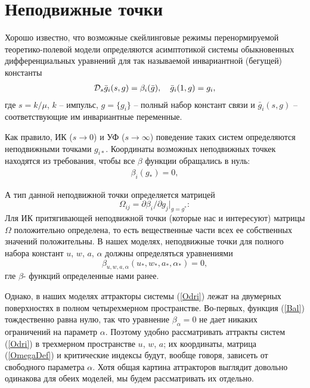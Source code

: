 \documentclass[a4paper,10pt]{article}
\def\D{{\cal D}}
\def\D{{\cal D}}
\begin{document}
\section{Неподвижные точки} \label{sec:FPS}

Хорошо известно, что возможные скейлинговые  режимы перенормируемой теоретико-полевой
модели определяются асимптотикой системы обыкновенных дифференциальных уравнений для так называемой
инвариантной (бегущей) константы
\begin{eqnarray}
\D_s \bar g_{i}(s,g) = \beta_{i} (\bar g), \quad \bar g_{i}(1,g) = g_{i},
\label{Odri}
\end{eqnarray}
где  $s=k/\mu$, $k$ -- импульс, $g= \{g_{i}\}$ -- полный набор констант связи
и  $\bar g_{i}(s,g)$ -- соответствующие им инвариантные переменные.

Как правило, ИК ($s\to0$) и УФ ($s\to\infty$) поведение таких систем определяются неподвижными точками $g_{i*}$.
Координаты возможных неподвижных точкек находятся из требования, чтобы все   $\beta$ функции обращались в нуль:
\begin{eqnarray}
\beta_{i} (g_{*}) =0,
\label{fp}
\end{eqnarray}

 А тип данной неподвижной точки определяется матрицей
\begin{equation}
\Omega_{ij} = \partial\beta_{i}/\partial g_{j} |_{g=g^*}:
\label{OmegaDef}
\end{equation}
Лля ИК притягивающей неподвижной точки (которые нас и  интересуют)
матрицы $\Omega$ положительно определена, то есть вещественные части всех ее собственных значений положительны.
В нашех моделях, неподвижные точки для полного набора констант $u$, $w$, $a$, $\alpha$ должны определяться уравнениями
\begin{equation}
\beta_{u,w,a,\alpha} (u_{*},w_{*},a_{*},\alpha_{*}) = 0,
\label{points}
\end{equation}
гле $\beta$- функций определенные нами ранее.

Однако, в наших моделях аттракторы системы (\ref{Odri}) лежат на двумерных поверхностях в полном четырехмерном пространстве.
Во-первых, функция (\ref{Bal})  тождественно равна нулю, так что уравнение $\beta_{\alpha}=0$ не дает никаких ограничений на параметр  $\alpha$.
Поэтому удобно рассматривать аттракты систем (\ref{Odri}) в трехмерном пространстве $u$, $w$, $a$; их координаты, матрица (\ref{OmegaDef})
и критические индексы будут, вообще говоря, зависеть от свободного параметра $\alpha$.
Хотя общая картина аттракторов выглядит довольно одинакова для обеих моделей, мы будем рассматривать их отдельно.
\end{document}
